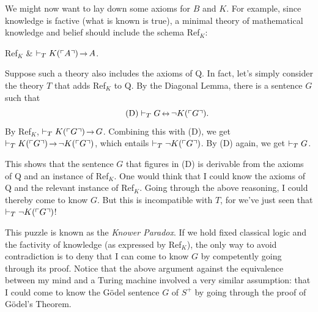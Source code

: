 We might now want to lay down some axioms for $B$ and $K$.
For example,
since knowledge is factive
(what is known is true),
a minimal theory of mathematical knowledge and belief should
include the schema Ref$_K$:
\begin{axioms}
    Ref$_K$ & $\proves_T K(\gn{A}) \to A$.
\end{axioms}
Suppose such a theory also includes the axioms of Q.
In fact,
let's simply consider the theory $T$ that adds Ref$_K$ to Q.
By the Diagonal Lemma, 
there is a sentence $G$ such that
\begin{equation}\tag{D}
  \proves_{T} G \leftrightarrow \neg K(\gn{G}).
\end{equation}
By Ref$_K$,
$\proves_{T} K(\gn{G}) \to G$.
Combining this with (D),
we get $\proves_{T} K(\gn{G}) \to \neg K(\gn{G})$,
which entails $\vdash_{T} \neg K(\ulcorner G \urcorner)$.
By (D) again,
we get $\vdash_{T} G$.

This shows that
the sentence $G$ that figures in (D)
is derivable from the axioms of Q and an instance of Ref$_K$.
One would think that I could know the axioms of Q and the relevant instance of Ref$_K$.
Going through the above reasoning,
I could thereby come to know $G$.
But this is incompatible with $T$,
for we've just seen that $\vdash_T \neg K(\ulcorner G \urcorner)$!

This puzzle is known as the \emph{Knower Paradox}.
If we hold fixed classical logic and the factivity of knowledge (as expressed by Ref$_K$),
the only way to avoid contradiction is to deny that
I can come to know $G$
by competently going through its proof.
Notice that
the above argument against the equivalence between my mind and a Turing machine
involved a very similar assumption:
that I could come to know the Gödel sentence $G$ of $S^+$
by going through the proof of Gödel's Theorem.


